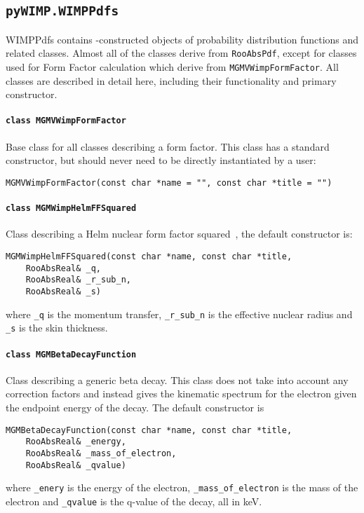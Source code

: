 		\subsection{\lstinline!pyWIMP.WIMPPdfs!}

WIMPPdfs contains \cpp-constructed objects of probability distribution functions and related classes.  Almost all of the classes derive from \lstinline!RooAbsPdf!, except for classes used for Form Factor calculation which derive from \lstinline!MGMVWimpFormFactor!.  All classes are described in detail here, including their functionality and primary constructor.  
			\paragraph{\lstinline!class MGMVWimpFormFactor!}
Base class for all classes describing a form factor.  This class has a standard constructor, but should never need to be directly
instantiated by a user: 
				\begin{lstlisting}
MGMVWimpFormFactor(const char *name = "", const char *title = "")
				\end{lstlisting}			
				
			\paragraph{\lstinline!class MGMWimpHelmFFSquared!}
Class describing a Helm nuclear form factor squared~\cite{Helm56}, the default constructor is: 
				\begin{lstlisting}
MGMWimpHelmFFSquared(const char *name, const char *title, 
	RooAbsReal& _q, 
	RooAbsReal& _r_sub_n, 
	RooAbsReal& _s)
				\end{lstlisting}
where \lstinline!_q! is the momentum transfer, \lstinline!_r_sub_n! is the effective nuclear radius and \lstinline!_s! is the skin thickness.
			
			\paragraph{\lstinline!class MGMBetaDecayFunction!}
Class describing a generic beta decay.  This class does not take into account any correction factors and instead gives the kinematic spectrum for the electron given the endpoint energy of the decay.  The default constructor is			
				\begin{lstlisting}
MGMBetaDecayFunction(const char *name, const char *title,
	RooAbsReal& _energy,
	RooAbsReal& _mass_of_electron,
	RooAbsReal& _qvalue)
				\end{lstlisting}	
where \lstinline!_enery! is the energy of the electron, \lstinline!_mass_of_electron! is the mass of the electron and  \lstinline!_qvalue! is the q-value of the decay, all in keV.

